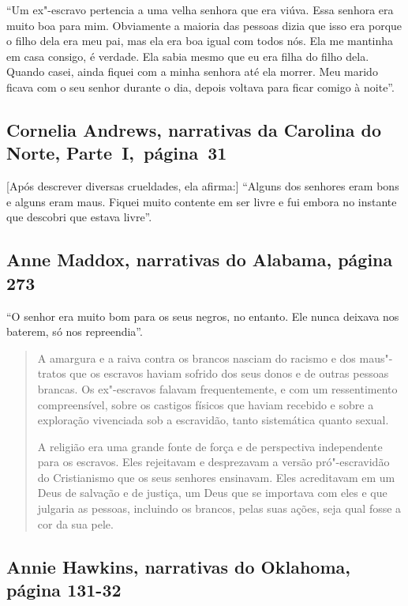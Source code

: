 ``Um ex"-escravo pertencia a uma velha senhora que era viúva. Essa
senhora era muito boa para mim. Obviamente a maioria das pessoas dizia
que isso era porque o filho dela era meu pai, mas ela era boa igual com
todos nós. Ela me mantinha em casa consigo, é verdade. Ela sabia mesmo
que eu era filha do filho dela. Quando casei, ainda fiquei com a minha
senhora até ela morrer. Meu marido ficava com o seu senhor durante o
dia, depois voltava para ficar comigo à noite''.

\subsection{Cornelia Andrews, narrativas da Carolina do Norte, Parte~I,~página~31} \label{ref09}

{[}Após descrever diversas crueldades, ela afirma:{]} ``Alguns dos
senhores eram bons e alguns eram maus. Fiquei muito contente em ser
livre e fui embora no instante que descobri que estava livre''.

\subsection{Anne Maddox, narrativas do Alabama, página 273}
\label{ref180}

``O senhor era muito bom para os seus negros, no entanto. Ele nunca
deixava nos baterem, só nos repreendia''.

\begin{quote}
A amargura e a raiva contra os brancos nasciam do racismo e dos
maus"-tratos que os escravos haviam sofrido dos seus donos e de outras
pessoas brancas. Os ex"-escravos falavam frequentemente, e com um
ressentimento compreensível, sobre os castigos físicos que haviam
recebido e sobre a exploração vivenciada sob a escravidão, tanto
sistemática quanto sexual.

A religião era uma grande fonte de força e de perspectiva
independente para os escravos. Eles rejeitavam e desprezavam a versão
pró"-escravidão do Cristianismo que os seus senhores ensinavam. Eles
acreditavam em um Deus de salvação e de justiça, um Deus que se
importava com eles e que julgaria as pessoas, incluindo os brancos,
pelas suas ações, seja qual fosse a cor da sua pele.
\end{quote}

\subsection{Annie Hawkins, narrativas do Oklahoma, página 131-32} \label{ref123}

